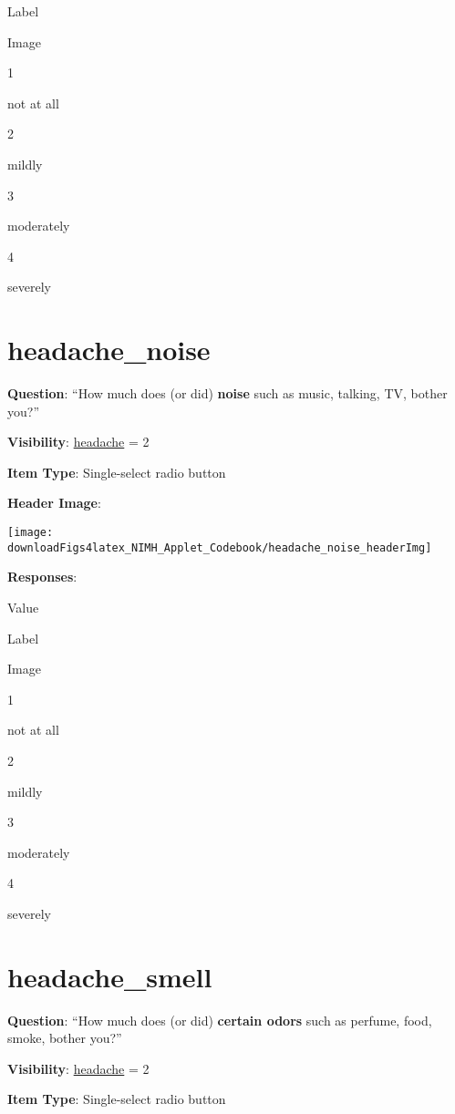 \documentclass[]{book}
\begin{document}
Label

Image

1

not at all

2

mildly

3

moderately

4

severely

\hypertarget{headache_noise}{%
\section{headache\_noise}\label{headache_noise}}

\textbf{Question}: ``How much does (or did) \textbf{noise} such as music, talking, TV, bother you?''

\textbf{Visibility}: \protect\hyperlink{headache}{headache} = 2

\textbf{Item Type}: Single-select radio button

\textbf{Header Image}:

\begin{flushleft}\texttt{[image: downloadFigs4latex\_NIMH\_Applet\_Codebook/headache\_noise\_headerImg]} \end{flushleft}

\textbf{Responses}:

Value

Label

Image

1

not at all

2

mildly

3

moderately

4

severely

\hypertarget{headache_smell}{%
\section{headache\_smell}\label{headache_smell}}

\textbf{Question}: ``How much does (or did) \textbf{certain odors} such as perfume, food, smoke, bother you?''

\textbf{Visibility}: \protect\hyperlink{headache}{headache} = 2

\textbf{Item Type}: Single-select radio button
\end{document}
